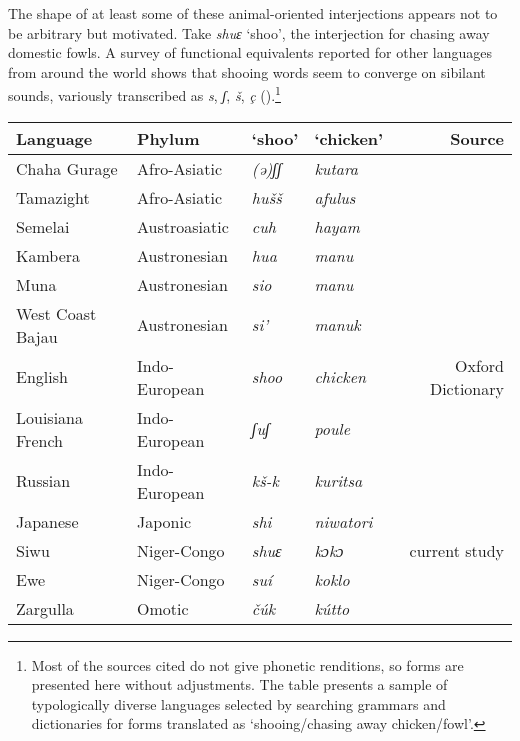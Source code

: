 \documentclass[output=paper]{langsci/langscibook}
\begin{document}
\normalsize
The shape of at least some of these animal-oriented interjections appears not to be arbitrary but motivated. Take \textit{shuɛ} ‘shoo’, the interjection for chasing away domestic fowls. A survey of functional equivalents reported for other languages from around the world shows that shooing words seem to converge on sibilant sounds, variously transcribed as \textit{s}, \textit{ʃ}, \textit{š}, \textit{ç} ().\footnote{Most of the sources cited do not give phonetic renditions, so forms are presented here without adjustments. The table presents a sample of typologically diverse languages selected by searching grammars and dictionaries for forms translated as ‘shooing/chasing away chicken/fowl’.}

\begin{table}
\small
\begin{tabularx}{\textwidth}{llllr}
\lsptoprule
Language & Phylum & ‘shoo’ & ‘chicken’ & Source\\
\midrule
Chaha Gurage & Afro-Asiatic & \textit{(ə)ʃʃ} & \textit{kutara} & \citealt{leslau_etymological_1979}\\
Tamazight & Afro-Asiatic & \textit{hušš} & \textit{afulus} & \citealt{bynon_domestic_1976}\\
Semelai & Austroasiatic & \textit{cuh} & \textit{hayam} & \citealt{kruspe_grammar_2004}\\
Kambera & Austronesian & \textit{hua} & \textit{manu} & \citealt{klamer_grammar_1998}\\
Muna & Austronesian & \textit{sio} & \textit{manu} & \citealt{berg_grammar_1989}\\
West Coast Bajau & Austronesian & \textit{si’} & \textit{manuk} & \citealt{miller_grammar_2007}\\
English & Indo-European & \textit{shoo} & \textit{chicken} & Oxford Dictionary\\
Louisiana French & Indo-European & \textit{ʃuʃ} & \textit{poule} & \citealt{valdman_dictionary_2009}\\
Russian & Indo-European & \textit{kš-k} & \textit{kuritsa} & \citealt{liston_defining_1971}\\
Japanese & Japonic & \textit{shi} & \textit{niwatori} & \citealt{bolton_language_1897}\\
Siwu & Niger-Congo & \textit{shuɛ} & \textit{kɔkɔ} & current study\\
Ewe & Niger-Congo & \textit{suí} & \textit{koklo} & \citealt{ameka_ewe_1991}\\
Zargulla & Omotic & \textit{čúk} & \textit{kútto} & \citealt{amha_directives_2013}\\

\end{tabularx}
\end{table}
\end{document}
